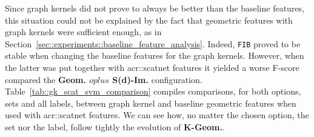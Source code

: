         Since graph kernels did not prove to always be better than the baseline features, this situation could not be explained by the fact that geometric features with graph kernels were sufficient enough, as in Section~\ref{sec::experiments::baseline_feature_analysis}.
        Indeed, \texttt{FIB} proved to be stable when changing the baseline features for the graph kernels.
        However, when the latter was put together with \gls{acr::scatnet} features it yielded a worse F-score compared the \textbf{Geom. \(oplus\) S(d)-Im.} configuration.\\

        Table~\ref{tab::gk_scat_svm_comparison} compiles comparisons, for both options, sets and all labels, between graph kernel and baseline geometric features when used with \gls{acr::scatnet} features.
        We can see how, no matter the chosen option, the set nor the label, follow tightly the evolution of \textbf{K-Geom.}.\\

